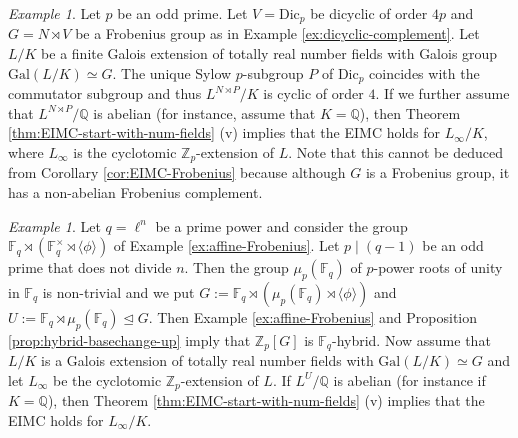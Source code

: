\documentclass[12pt]{amsart}
\theoremstyle{plain}
\theoremstyle{remark}
\newtheorem{example}[theorem]{Example}
\theoremstyle{definition}
\numberwithin{equation}{section}
\begin{document}
\begin{example} \label{ex:EIMC-dicyclic}
Let $p$ be an odd prime.
Let $V = {\mathrm{Dic}}_{p}$ be dicyclic of order $4p$ and $G = N \rtimes V$ be a Frobenius group as in Example \ref{ex:dicyclic-complement}.
Let $L/K$ be a finite Galois extension of totally real number fields with Galois group ${\mathrm{Gal}}(L/K) \simeq G$.
The unique Sylow $p$-subgroup $P$ of ${\mathrm{Dic}}_{p}$ coincides with the commutator subgroup
and thus $L^{N \rtimes P}/K$ is cyclic of order $4$.
If we further assume that $L^{N \rtimes P}/{\mathbb{Q}}$ is abelian (for instance, assume that $K={\mathbb{Q}}$),
then Theorem \ref{thm:EIMC-start-with-num-fields} (v) implies that the EIMC holds for $L_{\infty}/K$,
where $L_{\infty}$ is the cyclotomic ${\mathbb{Z}}_{p}$-extension of $L$.
Note that this cannot be deduced from Corollary \ref{cor:EIMC-Frobenius}
because although $G$ is a Frobenius group, it has a non-abelian Frobenius complement.
\end{example}

\begin{example} \label{ex:EIMC-modified-affine}
Let $q=\ell^{n}$ be a prime power and consider the group ${\mathbb{F}}_{q} \rtimes ({\mathbb{F}}_{q}^{\times} \rtimes \langle \phi \rangle)$
of Example \ref{ex:affine-Frobenius}. Let $p \mid (q-1)$ be an odd prime that does not divide $n$.
Then the group $\mu_{p}({\mathbb{F}}_{q})$ of $p$-power roots of unity in ${\mathbb{F}}_{q}$ is non-trivial and we put
$G := {\mathbb{F}}_{q} \rtimes (\mu_{p}({\mathbb{F}}_{q}) \rtimes \langle \phi \rangle)$ and $U := {\mathbb{F}}_{q} \rtimes \mu_{p}({\mathbb{F}}_{q}) \unlhd G$.
Then Example \ref{ex:affine-Frobenius} and Proposition \ref{prop:hybrid-basechange-up} imply that ${\mathbb{Z}}_{p}[G]$ is
${\mathbb{F}}_{q}$-hybrid.
Now assume that $L/K$ is a Galois extension of totally real number fields with ${\mathrm{Gal}}(L/K) \simeq G$
and let $L_{\infty}$ be the cyclotomic ${\mathbb{Z}}_{p}$-extension of $L$.
If $L^{U}/{\mathbb{Q}}$ is abelian (for instance if $K={\mathbb{Q}}$), then Theorem \ref{thm:EIMC-start-with-num-fields} (v) implies that the EIMC holds
for $L_{\infty}/K$.
\end{example}
\end{document}
